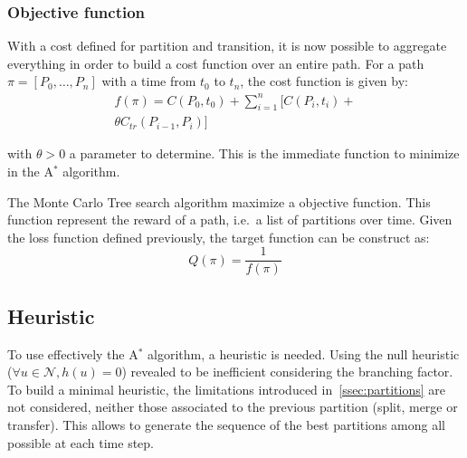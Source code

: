 \documentclass[oneside,twocolumn]{article}
\begin{document}
\subsubsection{Objective function}

With a cost defined for partition and transition, it is now possible to
aggregate everything in order to build a cost function over an entire
path. For a path $\pi = [P_0, \dots, P_n]$ with a time from $t_0$ to $t_n$,
the cost function is given by:
\begin{equation}
  \begin{split}
    f(\pi) = C(P_0, t_0) + \sum_{i = 1}^{n} [C(P_i, t_i) +\\
    \theta C_{tr}(P_{i-1}, P_i)]
  \end{split}
\end{equation}

with $\theta > 0$ a parameter to determine.
This is the immediate function to minimize in the A$^*$ algorithm.

The Monte Carlo Tree search algorithm maximize a objective function. This function
represent the reward of a path, i.e.\ a list of partitions over time.
Given the loss function defined previously, the target function can be
construct as:
\begin{equation}
  Q(\pi) = \frac{1}{f(\pi)}
\end{equation}


\subsection{Heuristic}
To use effectively the A\(^*\) algorithm, a heuristic is needed. Using the null
heuristic (\(\forall u \in \mathcal{N}, h(u) = 0\)) revealed to be inefficient
considering the branching factor. To build a minimal heuristic, the limitations
introduced in~\ref{ssec:partitions} are not considered, neither those associated
to the previous partition (split, merge or transfer). This allows to generate
the sequence of the best partitions among all possible at each time step.



\end{document}

